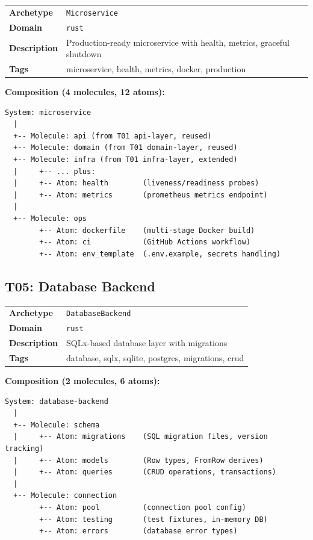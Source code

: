 \documentclass[11pt,a4paper,twoside]{article}
\theoremstyle{definition}
\theoremstyle{plain}
\theoremstyle{remark}
\begin{document}
\begin{tabularx}{\textwidth}{l X}
\toprule
\textbf{Archetype} & \texttt{Microservice} \\
\textbf{Domain} & \texttt{rust} \\
\textbf{Description} & Production-ready microservice with health, metrics, graceful shutdown \\
\textbf{Tags} & microservice, health, metrics, docker, production \\
\bottomrule
\end{tabularx}

\medskip\noindent\textbf{Composition (4 molecules, 12 atoms):}

\begin{lstlisting}
System: microservice
  |
  +-- Molecule: api (from T01 api-layer, reused)
  +-- Molecule: domain (from T01 domain-layer, reused)
  +-- Molecule: infra (from T01 infra-layer, extended)
  |     +-- ... plus:
  |     +-- Atom: health        (liveness/readiness probes)
  |     +-- Atom: metrics       (prometheus metrics endpoint)
  |
  +-- Molecule: ops
        +-- Atom: dockerfile    (multi-stage Docker build)
        +-- Atom: ci            (GitHub Actions workflow)
        +-- Atom: env_template  (.env.example, secrets handling)
\end{lstlisting}

\subsection{T05: Database Backend}\label{sec:t05}

\begin{tabularx}{\textwidth}{l X}
\toprule
\textbf{Archetype} & \texttt{DatabaseBackend} \\
\textbf{Domain} & \texttt{rust} \\
\textbf{Description} & SQLx-based database layer with migrations \\
\textbf{Tags} & database, sqlx, sqlite, postgres, migrations, crud \\
\bottomrule
\end{tabularx}

\medskip\noindent\textbf{Composition (2 molecules, 6 atoms):}

\begin{lstlisting}
System: database-backend
  |
  +-- Molecule: schema
  |     +-- Atom: migrations    (SQL migration files, version tracking)
  |     +-- Atom: models        (Row types, FromRow derives)
  |     +-- Atom: queries       (CRUD operations, transactions)
  |
  +-- Molecule: connection
        +-- Atom: pool          (connection pool config)
        +-- Atom: testing       (test fixtures, in-memory DB)
        +-- Atom: errors        (database error types)
\end{lstlisting}
\end{document}
